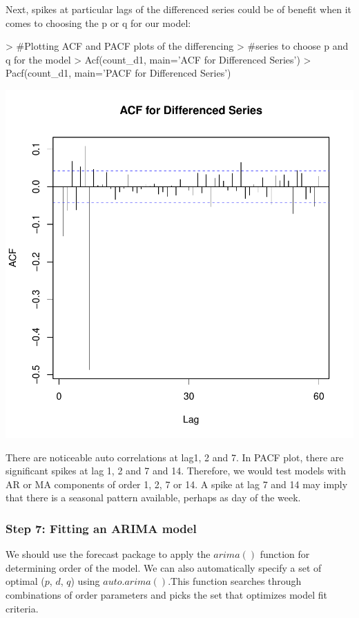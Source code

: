 \documentclass{article}
\begin{document}
Next, spikes at particular lags of the differenced series could be of benefit when it comes to choosing the p or q for our model:
\begin{Schunk}
\begin{Sinput}
> #Plotting ACF and PACF plots of the differencing 
> #series to choose p and q for the model
> Acf(count_d1, main='ACF for Differenced Series')
> Pacf(count_d1, main='PACF for Differenced Series')
\end{Sinput}
\end{Schunk}
\includegraphics{Report-019}


There are noticeable auto correlations at lag1, 2 and 7. In PACF plot, there are significant spikes at lag 1, 2 and 7 and 14. Therefore, we would test models with AR or MA components of order 1, 2, 7 or 14. A spike at lag 7 and 14 may imply that there is a seasonal pattern available, perhaps as day of the week. 

\subsubsection*{Step 7: Fitting an ARIMA model}

We should use the forecast package to apply the $arima()$ function for determining order of the model. We can also automatically specify a set of optimal ($p$, $d$, $q$) using $auto.arima()$.This function searches through combinations of order parameters and picks the set that optimizes model fit criteria.
\end{document}
